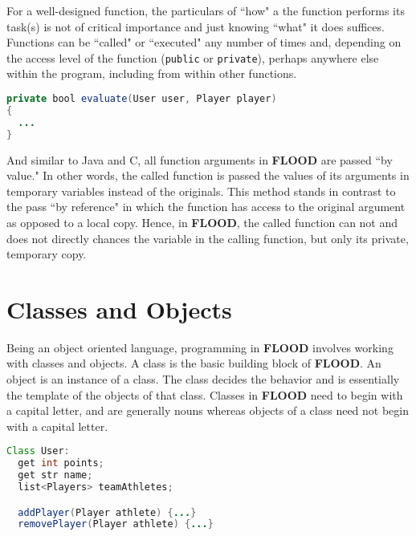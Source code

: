 \documentclass[12pt]{report}
\begin{document}
For a well-designed function, the particulars of ``how" a the function performs its task(s) is not of critical importance and just knowing ``what" it does suffices. Functions can be ``called" or ``executed" any number of times and, depending on the access level of the function (\texttt{public} or \texttt{private}), perhaps anywhere else within the program, including from within other functions.

\begin{singlespace}
\begin{lstlisting}[language=Java,label=some-code,caption=Syntax of a FLOOD function]
private bool evaluate(User user, Player player)
{
  ...
}
\end{lstlisting}
\end{singlespace}

And similar to Java and C, all function arguments in \textbf{FLOOD} are passed ``by value." In other words, the called function is passed the values of its arguments in temporary variables instead of the originals. This method stands in contrast to the pass ``by reference" in which the function has access to the original argument as opposed to a local copy. Hence, in \textbf{FLOOD}, the called function can not and does not directly chances the variable in the calling function, but only its private, temporary copy.

\section{Classes and Objects}

Being an object oriented language, programming in \textbf{FLOOD} involves working with classes and objects. A class is the basic building block of \textbf{FLOOD}. An object is an instance of a class. The class decides the behavior and is essentially the template of the objects of that class. Classes in \textbf{FLOOD} need to begin with a capital letter, and are generally nouns whereas objects of a class need not begin with a capital letter. 

\begin{singlespace}
\begin{lstlisting}[language=Java,label=some-code,caption=Typical definition of a class in FLOOD]
Class User:
  get int points;
  get str name;
  list<Players> teamAthletes;

  addPlayer(Player athlete) {...}
  removePlayer(Player athlete) {...}
\end{lstlisting}
\end{singlespace}
\end{document}
